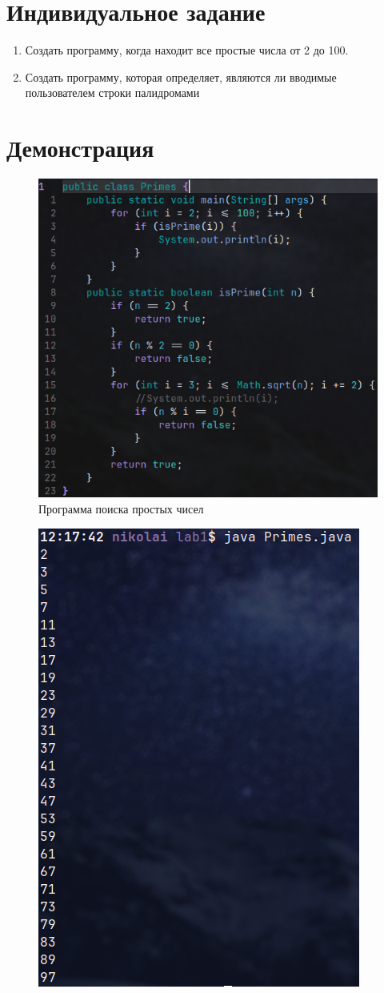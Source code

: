 \documentclass[a4paper, 17pt]{extarticle}
\begin{document}
\section{Индивидуальное задание}
\begin{enumerate}
  \item Создать программу, когда находит все простые числа от 2 до 100.
  \item Создать программу, которая определяет, являются ли вводимые пользователем
  строки палидромами
\end{enumerate}

\pagebreak

\section{Демонстрация}

\begin{figure}[h]
  \centering
  \includegraphics[width=.4\textwidth]{primes.png}
  \caption{Программа поиска простых чисел}
\end{figure}

\begin{figure}[h]
  \centering
  \includegraphics[width=.4\textwidth]{primes_output.png}
  \caption{}
\end{figure}
\end{document}
